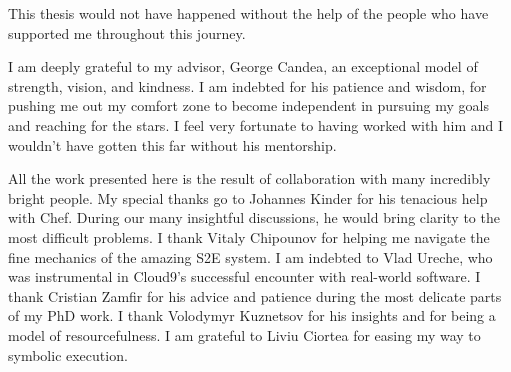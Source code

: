 This thesis would not have happened without the help of the people who have supported me throughout this journey.

I am deeply grateful to my advisor, George Candea, an exceptional model of strength, vision, and kindness.
%
I am indebted for his patience and wisdom, for pushing me out my comfort zone to become independent in pursuing my goals and reaching for the stars.  I feel very fortunate to having worked with him and I wouldn't have gotten this far without his mentorship.

All the work presented here is the result of collaboration with many incredibly bright people.
%
My special thanks go to Johannes Kinder for his tenacious help with Chef.  During our many insightful discussions, he would bring clarity to the most difficult problems.
%
I thank Vitaly Chipounov for helping me navigate the fine mechanics of the amazing S2E system.
%
I am indebted to Vlad Ureche, who was instrumental in Cloud9's successful encounter with real-world software.
%
I thank Cristian Zamfir for his advice and patience during the most delicate parts of my PhD work.
%
I thank Volodymyr Kuznetsov for his insights and for being a model of resourcefulness.
%
I am grateful to Liviu Ciortea for easing my way to symbolic execution.










